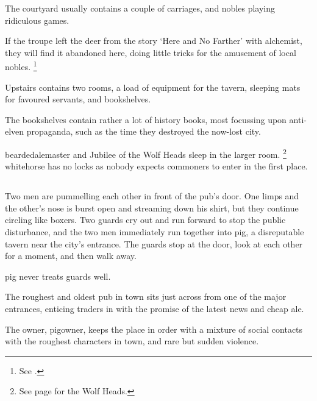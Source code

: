 \begin{multicols}{2}
\begin{boxtext}
\end{boxtext}

The courtyard usually contains a couple of carriages, and nobles playing ridiculous games.

If the troupe left the deer from the story `Here and No Farther' with \gls{alchemist}, they will find it abandoned here, doing little tricks for the amusement of local nobles.
\footnote{See .}


Upstairs contains two rooms, a load of equipment for the tavern, sleeping mats for favoured servants, and bookshelves.

The bookshelves contain rather a lot of history books, most focussing upon anti-elven propaganda, such as the time they destroyed the now-lost city.

\Gls{beardedalemaster} and Jubilee of the Wolf Heads sleep in the larger room.%
\footnote{See page \pageref{wolfHeads} for the Wolf Heads.}
\Gls{whitehorse} has no locks as nobody expects commoners to enter in the first place.
 

\subsection{}

\begin{boxtext}

  Two men are pummelling each other in front of the pub's door.
   One limps and the other's nose is burst open and streaming down his shirt, but they continue circling like boxers.
   Two guards cry out and run forward to stop the public disturbance, and the two men immediately run together into \gls{pig}, a disreputable tavern near the city's entrance.
   The guards stop at the door, look at each other for a moment, and then walk away.

\Gls{pig} never treats \glspl{guard} well.

\end{boxtext}
 
The roughest and oldest pub in \gls{town} sits just across from one of the major entrances, enticing traders in with the promise of the latest news and cheap ale.

The owner, \gls{pigowner}, keeps the place in order with a mixture of social contacts with the roughest characters in \gls{town}, and rare but sudden violence.


\end{multicols}
